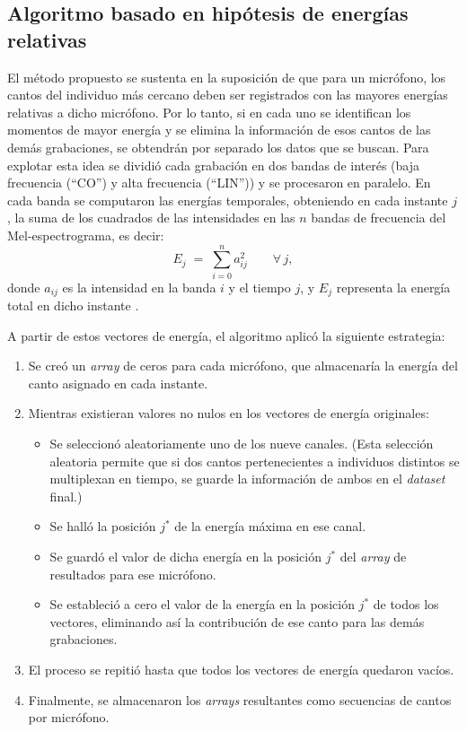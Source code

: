 \subsection{Algoritmo basado en hipótesis de energías relativas}
\label{sec:alg_energia}

El método propuesto se sustenta en la suposición de que
para un micrófono, los cantos del individuo más cercano deben ser registrados con las
mayores energías relativas a dicho micrófono. Por lo tanto, si en cada uno se identifican 
los momentos de mayor energía y se elimina la información de esos cantos de las demás grabaciones,
se obtendrán por separado los datos que se buscan.
Para explotar esta idea se dividió cada 
grabación en dos bandas de interés (baja frecuencia (“CO”) y 
alta frecuencia (“LIN”)) y se procesaron en paralelo. En cada 
banda se computaron las energías temporales, 
obteniendo en cada instante \(j\), la suma 
de los cuadrados de las intensidades en las \(n\) bandas de 
frecuencia del Mel-espectrograma, es decir:
\begin{equation}
    \label{energyformula}
    E_j \;=\; \sum_{i=0}^{n} a_{ij}^2 
    \qquad\forall\,j,
\end{equation}
donde \(a_{ij}\) es la intensidad en la banda \(i\) y el tiempo 
\(j\), y \(E_j\) representa la energía total en dicho instante 
\cite{jurafskyspeech}. 


A partir de estos vectores de energía, el algoritmo aplicó la 
siguiente estrategia:

\begin{enumerate}
  \item Se creó un \emph{array} de ceros para cada micrófono, que almacenaría la energía del canto asignado en cada instante.
  \item Mientras existieran valores no nulos en los vectores de energía originales:
  \begin{itemize}
    \item Se seleccionó aleatoriamente uno de los nueve canales. (Esta selección aleatoria permite que si dos cantos pertenecientes a individuos distintos se multiplexan en tiempo, se guarde la información de ambos en el \emph{dataset} final.)
    \item Se halló la posición \(j^*\) de la energía máxima en ese canal.
    \item Se guardó el valor de dicha energía en la posición \(j^*\) del \emph{array} de resultados para ese micrófono.
    \item Se estableció a cero el valor de la energía en la posición \(j^*\) de todos los vectores, eliminando así la contribución de ese canto para las demás grabaciones.
  \end{itemize}
  \item El proceso se repitió hasta que todos los vectores de energía quedaron vacíos.
  \item Finalmente, se almacenaron los \emph{arrays} resultantes como secuencias de cantos por micrófono.
\end{enumerate}


